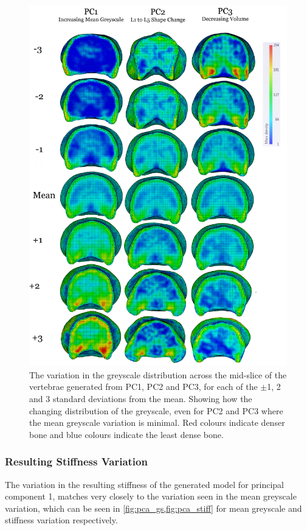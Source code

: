 \begin{figure}[p]
  \centering
  \includegraphics[width=.9\textwidth]{Chapters/Chapter_PCA_images/all_pc1_2_3_slice_gs_density.png}
	\caption[The variation in the greyscale distribution across the mid-slice of the vertebrae generated from the first three principal components.]{The variation in the greyscale distribution across the mid-slice of the vertebrae generated from PC1, PC2 and PC3, for each of the $\pm$1, 2 and 3 standard deviations from the mean.
Showing how the changing distribution of the greyscale, even for PC2 and PC3 where the mean greyscale variation is minimal.
Red colours indicate denser bone and blue colours indicate the least dense bone.}
  \label{fig:all_pc1_2_3_slice_gs_density}
\end{figure}

\subsubsection{Resulting Stiffness Variation}

The variation in the resulting stiffness of the generated model for principal component 1, matches very closely to the variation seen in the mean greyscale variation, which can be seen in \cref{fig:pca_gs,fig:pca_stiff} for mean greyscale and stiffness variation respectively.

